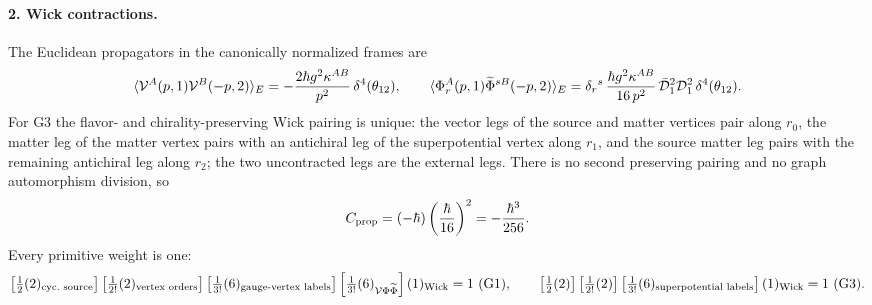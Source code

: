 \paragraph{2. Wick contractions.} The Euclidean propagators in the canonically normalized frames are
\begin{equation}\label{eq:ss:ab:propagators}
\langle\mathcal{V}^{A}(p,1)\mathcal{V}^{B}(-p,2)\rangle_E
=-\frac{2\hbar g^{2}\kappa^{AB}}{p^{2}}\,\delta^{4}(\theta_{12}),
\qquad
\langle\Phi_r^{A}(p,1)\widetilde\Phi^{sB}(-p,2)\rangle_E
=\delta_r{}^{s}\,\frac{\hbar g^{2}\kappa^{AB}}{16\,p^{2}}\,
\bar{\mathcal{D}}_1^{2}\mathcal{D}_1^{2}\,\delta^{4}(\theta_{12}) .
\end{equation}
For G3 the flavor- and chirality-preserving Wick pairing is unique: the vector legs of the source and matter vertices pair along $r_0$, the matter leg of the matter vertex pairs with an antichiral leg of the superpotential vertex along $r_1$, and the source matter leg pairs with the remaining antichiral leg along $r_2$; the two uncontracted legs are the external legs. There is no second preserving pairing and no graph automorphism division, so
\begin{equation}\label{eq:ss:ab:cprop}
C_{\mathrm{prop}}=(-\hbar)\left(\frac{\hbar}{16}\right)^{2}=-\frac{\hbar^{3}}{256} .
\end{equation}
Every primitive weight is one:
\begin{equation}\label{eq:ss:ab:mult}
\left[\tfrac12(2)_{\text{cyc.\ source}}\right]
\left[\tfrac1{2!}(2)_{\text{vertex orders}}\right]
\left[\tfrac1{3!}(6)_{\text{gauge-vertex labels}}\right]
\left[\tfrac1{3!}(6)_{\mathcal{V}\Phi\widetilde\Phi}\right]
(1)_{\mathrm{Wick}}=1\ \text{(G1)},\qquad
\left[\tfrac12(2)\right]
\left[\tfrac1{2!}(2)\right]
\left[\tfrac1{3!}(6)_{\text{superpotential labels}}\right]
(1)_{\mathrm{Wick}}=1\ \text{(G3)} .
\end{equation}

